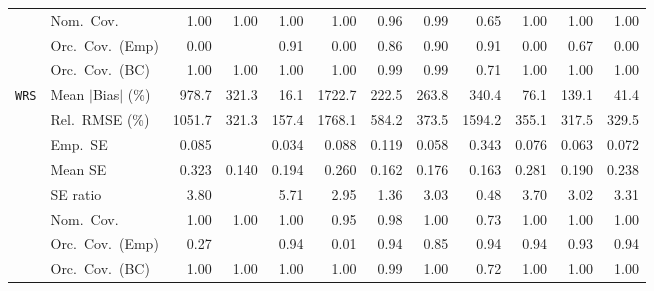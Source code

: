 \begin{landscape}
\begin{longtable}{llrrrrrrrrrr}
 & Nom.\ Cov. & \cellcolor{rankthree}1.00 & \cellcolor{rankthree}1.00 & \cellcolor{rankthree}1.00 & \cellcolor{rankthree}1.00 & \cellcolor{rankone}0.96 & \cellcolor{ranktwo}0.99 & 0.65 & \cellcolor{rankthree}1.00 & \cellcolor{rankthree}1.00 & \cellcolor{rankthree}1.00 \\
 & Orc.\ Cov.\ (Emp) & 0.00 &  & \cellcolor{rankone}0.91 & 0.00 & \cellcolor{rankthree}0.86 & \cellcolor{ranktwo}0.90 & \cellcolor{rankone}0.91 & 0.00 & 0.67 & 0.00 \\
 & Orc.\ Cov.\ (BC) & \cellcolor{ranktwo}1.00 & \cellcolor{ranktwo}1.00 & \cellcolor{ranktwo}1.00 & \cellcolor{ranktwo}1.00 & \cellcolor{rankone}0.99 & \cellcolor{rankone}0.99 & \cellcolor{rankthree}0.71 & \cellcolor{ranktwo}1.00 & \cellcolor{ranktwo}1.00 & \cellcolor{ranktwo}1.00 \\
\addlinespace[2pt]
\quad \texttt{WRS} & Mean $|$Bias$|$ (\%) & 978.7 & 321.3 & \cellcolor{rankone}16.1 & 1722.7 & 222.5 & 263.8 & 340.4 & \cellcolor{rankthree}76.1 & 139.1 & \cellcolor{ranktwo}41.4 \\
 & Rel.\ RMSE (\%) & 1051.7 & \cellcolor{rankthree}321.3 & \cellcolor{rankone}157.4 & 1768.1 & 584.2 & 373.5 & 1594.2 & 355.1 & \cellcolor{ranktwo}317.5 & 329.5 \\
 & Emp.\ SE & 0.085 &  & 0.034 & 0.088 & 0.119 & 0.058 & 0.343 & 0.076 & 0.063 & 0.072 \\
 & Mean SE & 0.323 & 0.140 & 0.194 & 0.260 & 0.162 & 0.176 & 0.163 & 0.281 & 0.190 & 0.238 \\
 & SE ratio & 3.80 &  & 5.71 & \cellcolor{rankthree}2.95 & \cellcolor{rankone}1.36 & 3.03 & \cellcolor{ranktwo}0.48 & 3.70 & 3.02 & 3.31 \\
 & Nom.\ Cov. & \cellcolor{rankthree}1.00 & \cellcolor{rankthree}1.00 & \cellcolor{rankthree}1.00 & \cellcolor{rankone}0.95 & \cellcolor{ranktwo}0.98 & \cellcolor{rankthree}1.00 & 0.73 & \cellcolor{rankthree}1.00 & \cellcolor{rankthree}1.00 & \cellcolor{rankthree}1.00 \\
 & Orc.\ Cov.\ (Emp) & 0.27 &  & \cellcolor{rankone}0.94 & 0.01 & \cellcolor{rankone}0.94 & \cellcolor{rankthree}0.85 & \cellcolor{rankone}0.94 & \cellcolor{rankone}0.94 & \cellcolor{ranktwo}0.93 & \cellcolor{rankone}0.94 \\
 & Orc.\ Cov.\ (BC) & \cellcolor{ranktwo}1.00 & \cellcolor{ranktwo}1.00 & \cellcolor{ranktwo}1.00 & \cellcolor{ranktwo}1.00 & \cellcolor{rankone}0.99 & \cellcolor{ranktwo}1.00 & \cellcolor{rankthree}0.72 & \cellcolor{ranktwo}1.00 & \cellcolor{ranktwo}1.00 & \cellcolor{ranktwo}1.00 \\

\end{longtable}
\end{landscape}
